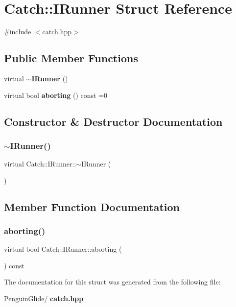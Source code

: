 \section{Catch\+::I\+Runner Struct Reference}
\label{struct_catch_1_1_i_runner}


{\ttfamily \#include $<$catch.\+hpp$>$}

\subsection*{Public Member Functions}
\begin{DoxyCompactItemize}
\item 
virtual \textbf{ $\sim$\+I\+Runner} ()
\item 
virtual bool \textbf{ aborting} () const =0
\end{DoxyCompactItemize}


\subsection{Constructor \& Destructor Documentation}
\mbox{\label{struct_catch_1_1_i_runner_a5f539a88a7772d68de8a2e4028774209}} 
\subsubsection{$\sim$IRunner()}
{\footnotesize\ttfamily virtual Catch\+::\+I\+Runner\+::$\sim$\+I\+Runner (\begin{DoxyParamCaption}{ }\end{DoxyParamCaption})\hspace{0.3cm}{\ttfamily [virtual]}}



\subsection{Member Function Documentation}
\mbox{\label{struct_catch_1_1_i_runner_a03713202dd2e041e30b8030088ab0116}} 
\subsubsection{aborting()}
{\footnotesize\ttfamily virtual bool Catch\+::\+I\+Runner\+::aborting (\begin{DoxyParamCaption}{ }\end{DoxyParamCaption}) const\hspace{0.3cm}{\ttfamily [pure virtual]}}



The documentation for this struct was generated from the following file\+:\begin{DoxyCompactItemize}
\item 
Penguin\+Glide/\textbf{ catch.\+hpp}\end{DoxyCompactItemize}
